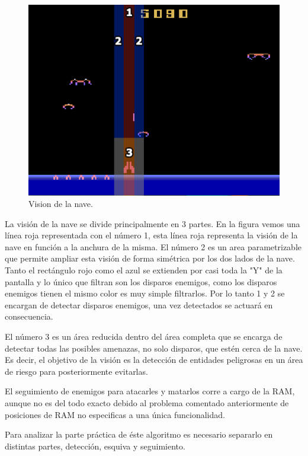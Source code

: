 \begin{figure}[h]
	\centering
	\includegraphics[width=1\textwidth]{Figures/demonAttackVision}
	\caption{Vision de la nave.}
	\label{fig:demonAttackVision}
\end{figure}

La visión de la nave se divide principalmente en 3 partes. En la figura vemos una línea roja representada con el número 1, esta línea roja representa la visión de la nave en función a la anchura de la misma. El número 2 es un area parametrizable que permite ampliar esta visión de forma simétrica por los dos lados de la nave. Tanto el rectángulo rojo como el azul se extienden por casi toda la "Y" de la pantalla y lo único que filtran son los disparos enemigos, como los disparos enemigos tienen el mismo color es muy simple filtrarlos. Por lo tanto 1 y 2 se encargan de detectar disparos enemigos, una vez detectados se actuará en consecuencia.

El número 3 es un área reducida dentro del área completa que se encarga de detectar todas las posibles amenazas, no solo disparos, que estén cerca de la nave. Es decir, el objetivo de la visión es la detección de entidades peligrosas en un área de riesgo para posteriormente evitarlas.

El seguimiento de enemigos para atacarles y matarlos corre a cargo de la RAM, aunque no es del todo exacto debido al problema comentado anteriormente de posiciones de RAM no especificas a una única funcionalidad.

Para analizar la parte práctica de éste algoritmo es necesario separarlo en distintas partes, detección, esquiva y seguimiento.

